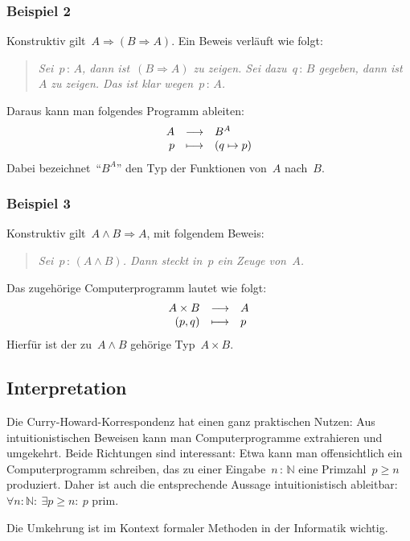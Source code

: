 \documentclass[a4paper,ngerman,12pt]{scrartcl}
\theoremstyle{definition}
\theoremstyle{plain}
\theoremstyle{remark}
\newcommand{\NN}{\mathbb{N}}
\renewcommand{\_}{\mathpunct{.}\,}
\newcommand{\?}{\,{:}\,}
\begin{document}
\subsubsection*{Beispiel 2}

Konstruktiv gilt~$A \Rightarrow (B \Rightarrow A)$. Ein Beweis verläuft
wie folgt:
\begin{quote}\emph{Sei~$p\?A$, dann ist~$(B \Rightarrow A)$ zu zeigen. Sei
dazu~$q\?B$ gegeben, dann ist~$A$ zu zeigen. Das ist klar
wegen~$p\?A$.}\end{quote}
Daraus kann man folgendes Programm ableiten:
\[ \begin{array}{@{}rcl@{}}
  A &\longrightarrow& B^A \\
  p &\longmapsto& (q \mapsto p)
\end{array} \]
Dabei bezeichnet~"`$B^A$"' den Typ der Funktionen von~$A$ nach~$B$.


\subsubsection*{Beispiel 3}

Konstruktiv gilt~$A \wedge B \Rightarrow A$, mit folgendem Beweis:
\begin{quote}\emph{Sei~$p\?(A \wedge B)$. Dann steckt in~$p$ ein Zeuge
von~$A$.}\end{quote}
Das zugehörige Computerprogramm lautet wie folgt:
\[ \begin{array}{@{}rcl@{}}
  A \times B &\longrightarrow& A \\
  (p,q) &\longmapsto& p
\end{array} \]
Hierfür ist der zu~$A \wedge B$ gehörige Typ~$A \times B$.


\subsection{Interpretation}

Die Curry-Howard-Korrespondenz hat einen ganz praktischen Nutzen: Aus
intuitionistischen Beweisen kann man Computerprogramme extrahieren und
umgekehrt. Beide Richtungen sind interessant: Etwa kann man offensichtlich ein
Computerprogramm schreiben, das zu einer Eingabe~$n \? \NN$ eine Primzahl~$p
\geq n$ produziert. Daher ist auch die entsprechende Aussage intuitionistisch
ableitbar:~$\forall n{:}\NN{:}\ \exists p \geq n{:}\ \text{$p$ prim}$.

Die Umkehrung ist im Kontext formaler Methoden in der Informatik wichtig.
\end{document}
